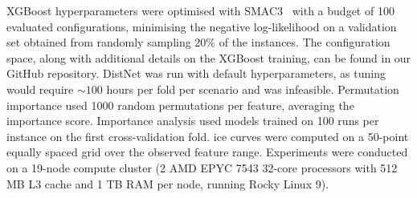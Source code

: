 XGBoost hyperparameters were optimised with SMAC3~\citep{LinEtAl22} with a budget of 100 evaluated configurations, minimising the negative log-likelihood
on a validation set obtained from randomly sampling 20\% of the instances. 
The configuration space, along with additional details on the XGBoost training, %
can be found in our GitHub repository.
DistNet was run with default hyperparameters, as tuning would require $\sim 100$ hours per fold per scenario and was infeasible. 
Permutation importance used 1000 random permutations per feature, averaging the importance score.
Importance analysis used models trained on 100 runs per instance on the first cross-validation fold.
\Gls{ice} curves were computed on a 50-point equally spaced grid over the observed feature range.
Experiments were conducted on a 19-node compute cluster (2 AMD EPYC 7543 32-core processors with 512 MB L3 cache and 1 TB RAM per node, running Rocky Linux 9).






